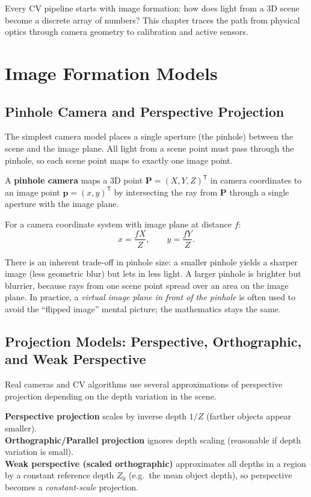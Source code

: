 \documentclass[11pt, oneside]{book}
\newcommand{\T}{^{\mathsf{T}}}
\newcommand{\vct}[1]{\bm{#1}}           %
\begin{document}
Every CV pipeline starts with image formation: how does light from a 3D scene become a discrete array of numbers?
This chapter traces the path from physical optics through camera geometry to calibration and active sensors.

\section{Image Formation Models}

\subsection{Pinhole Camera and Perspective Projection}

The simplest camera model places a single aperture (the pinhole) between the scene and the image plane.
All light from a scene point must pass through the pinhole, so each scene point maps to exactly one image point.

\begin{defbox}[title={Pinhole Camera}]
A \textbf{pinhole camera} maps a 3D point $\vct{P}=(X,Y,Z)\T$ in camera coordinates to an image point
$\vct{p}=(x,y)\T$ by intersecting the ray from $\vct{P}$ through a single aperture with the image plane.
\end{defbox}

\begin{thmbox}[title={Perspective Projection}]
For a camera coordinate system with image plane at distance $f$:
\[
x = \frac{fX}{Z},\qquad y = \frac{fY}{Z}.
\]
\end{thmbox}

There is an inherent trade-off in pinhole size: a smaller pinhole yields a sharper image (less geometric blur)
but lets in less light. A larger pinhole is brighter but blurrier, because rays from one scene point spread
over an area on the image plane.
In practice, a \emph{virtual image plane in front of the pinhole} is often used to avoid the ``flipped image''
mental picture; the mathematics stays the same.

\subsection{Projection Models: Perspective, Orthographic, and Weak Perspective}

Real cameras and CV algorithms use several approximations of perspective projection depending on
the depth variation in the scene.

\begin{defbox}[title={Projection Models}]
\textbf{Perspective projection} scales by inverse depth $1/Z$ (farther objects appear smaller). \\
\textbf{Orthographic/Parallel projection} ignores depth scaling (reasonable if depth variation is small). \\
\textbf{Weak perspective (scaled orthographic)} approximates all depths in a region by a constant reference depth
$Z_0$ (e.g.\ the mean object depth), so perspective becomes a \emph{constant-scale} projection.
\end{defbox}
\end{document}
